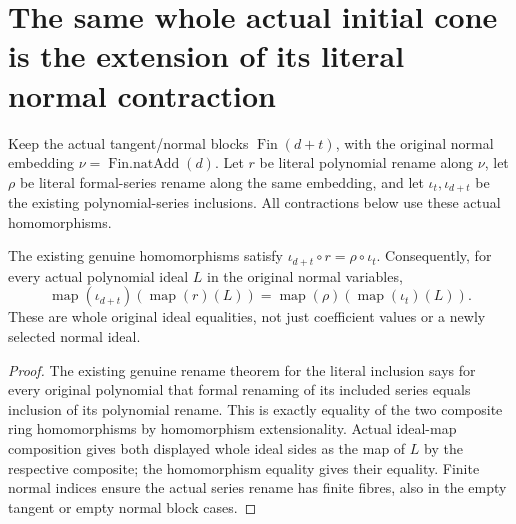 \section{The same whole actual initial cone is the extension of its literal normal contraction}

Keep the actual tangent/normal blocks $\operatorname{Fin}(d+t)$,
with the original normal embedding $\nu=\operatorname{Fin.natAdd}(d)$.
Let $r$ be literal polynomial rename along $\nu$, let $\rho$ be
literal formal-series rename along the same embedding, and let
$\iota_t,\iota_{d+t}$ be the existing polynomial-series inclusions.
All contractions below use these actual homomorphisms.

\begin{theorem}
\label{hir:actual-polynomial-series-normal-rename-square}
\leanok
The existing genuine homomorphisms satisfy
$\iota_{d+t}\circ r=\rho\circ\iota_t$.
Consequently, for every actual polynomial ideal $L$ in the original
normal variables,
\[
 \operatorname{map}(\iota_{d+t})(\operatorname{map}(r)(L))
 =\operatorname{map}(\rho)(\operatorname{map}(\iota_t)(L)).
\]
These are whole original ideal equalities, not just coefficient
values or a newly selected normal ideal.
\end{theorem}
\begin{proof}
The existing genuine rename theorem for the literal inclusion says
for every original polynomial that formal renaming of its included
series equals inclusion of its polynomial rename. This is exactly
equality of the two composite ring homomorphisms by homomorphism
extensionality. Actual ideal-map composition gives both displayed
whole ideal sides as the map of $L$ by the respective composite;
the homomorphism equality gives their equality. Finite normal
indices ensure the actual series rename has finite fibres, also in
the empty tangent or empty normal block cases.
\end{proof}

